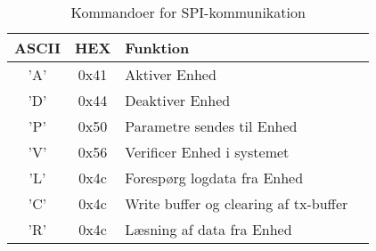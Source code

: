 \begin{table}[H]
\caption{Kommandoer for SPI-kommunikation}
\centering
\begin{tabular}{|c|c|l|c|}
\hline 
\textbf{ASCII} & \textbf{HEX} & \textbf{Funktion} \\ 
\hline 
'A' & 0x41 & Aktiver Enhed \\ 
\hline 
'D' & 0x44 & Deaktiver Enhed \\ 
\hline 
'P' & 0x50 & Parametre sendes til Enhed \\
\hline 
'V' & 0x56 & Verificer Enhed i systemet \\ 
\hline
'L' & 0x4c & Forespørg logdata fra Enhed \\ 
\hline
'C' & 0x4c & Write buffer og clearing af tx-buffer  \\
\hline
'R' & 0x4c & Læsning af data fra Enhed \\
\end{tabular}
\label{tabel:SWProtokol-kommandoer}
\end{table} 

